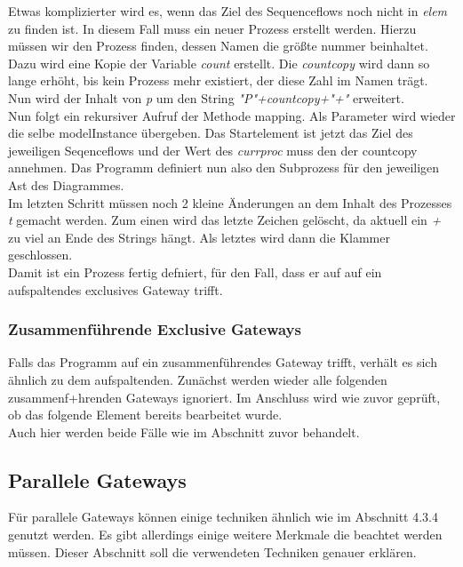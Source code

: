 Etwas komplizierter wird es, wenn das Ziel des Sequenceflows noch nicht in \textit{elem} zu finden ist. In diesem Fall muss ein neuer Prozess erstellt werden. Hierzu müssen wir den Prozess finden, dessen Namen die größte nummer beinhaltet. Dazu wird eine Kopie der Variable \textit{count} erstellt. Die \textit{countcopy} wird dann so lange erhöht, bis kein Prozess mehr existiert, der diese Zahl im Namen trägt.\\
Nun wird der Inhalt von \textit{p} um den String \textit{"P"+countcopy+"+"} erweitert.\\
Nun folgt ein rekursiver Aufruf der Methode mapping. Als Parameter wird wieder die selbe modelInstance übergeben. Das Startelement ist jetzt das Ziel des jeweiligen Seqenceflows und der Wert des \textit{currproc} muss den der countcopy annehmen. Das Programm definiert nun also den Subprozess für den jeweiligen Ast des Diagrammes.\\
Im letzten Schritt müssen noch 2 kleine Änderungen an dem Inhalt des Prozesses \textit{t} gemacht werden. Zum einen wird das letzte Zeichen gelöscht, da aktuell ein \textit{+} zu viel an Ende des Strings hängt. Als letztes wird dann die Klammer geschlossen.\\
Damit ist ein Prozess fertig defniert, für den Fall, dass er auf auf ein aufspaltendes exclusives Gateway trifft.
\subsubsection{Zusammenführende Exclusive Gateways}\label{Zusammenführende Exclusive Gateways}
Falls das Programm auf ein zusammenführendes Gateway trifft, verhält es sich ähnlich zu dem aufspaltenden. Zunächst werden wieder alle folgenden zusammenf+hrenden Gateways ignoriert. Im Anschluss wird wie zuvor geprüft, ob das folgende Element bereits bearbeitet wurde.\\
Auch hier werden beide Fälle wie im Abschnitt zuvor behandelt. 
\subsection {Parallele Gateways}\label{Parallele Gateways}
Für parallele Gateways können einige techniken ähnlich wie im Abschnitt 4.3.4 genutzt werden. Es gibt allerdings einige weitere Merkmale die beachtet werden müssen. Dieser Abschnitt soll die verwendeten Techniken genauer erklären.\\
